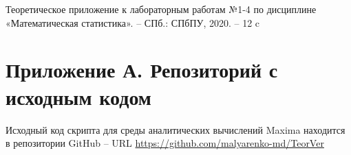 \documentclass[12pt]{article}
\begin{document}
\begin{flushleft}
\newpage


\begin{thebibliography}{9}

        Теоретическое приложение к лабораторным работам №1-4 по дисциплине «Математическая статистика». -- СПб.: СПбПУ, 2020. -- 12 c 
	
\end{thebibliography}

\newpage

\section*{Приложение А. Репозиторий с исходным кодом}

Исходный код скрипта для среды аналитических вычислений Maxima находится в репозитории GitHub -- URL \url{https://github.com/malyarenko-md/TeorVer}

\end{flushleft}
\end{document}
